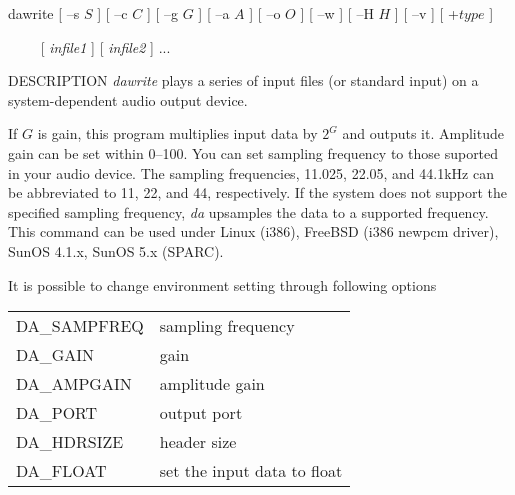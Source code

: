 %
\hypertarget{dawrite}{}
\begin{synopsis}
\item [dawrite] [ --s $S$ ] [ --c $C$ ] [ --g $G$ ] [ --a $A$ ] [ --o $O$ ]
           [ --w ] [ --H $H$ ] [ --v ] [ +$type$ ]
\item [\ ~~~] [ {\em infile1} ] [ {\em infile2} ] ...
\end{synopsis}

\begin{qsection}{DESCRIPTION}
{\em dawrite} plays a series of input files (or standard input) 
on a system-dependent audio output device.

If $G$ is gain, this program multiplies input data by $2^G$
and outputs it.
Amplitude gain can be set within 0--100.
You can set sampling frequency to those suported in your audio device.
The sampling frequencies, 11.025, 22.05, and 44.1kHz can be abbreviated to 
11, 22, and 44, respectively.
If the system does not support the specified sampling frequency, 
{\em da} upsamples the data to a supported frequency.
This command can be used under
Linux (i386), FreeBSD (i386 newpcm driver), SunOS 4.1.x, SunOS 5.x (SPARC).
 
It is possible to change environment setting through following options

\begin{tabular}{ll}
DA\_SAMPFREQ & sampling frequency\\
DA\_GAIN & gain\\
DA\_AMPGAIN & amplitude gain\\
DA\_PORT & output port\\
DA\_HDRSIZE & header size\\
DA\_FLOAT & set the input data to float\\
\end{tabular}

\end{qsection}

\begin{options}
\end{options}

